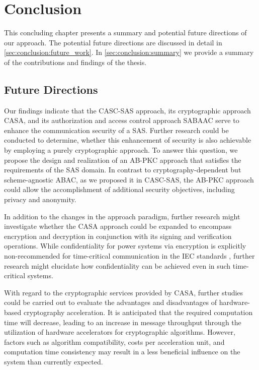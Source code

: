 \chapter{Conclusion}
\label{ch:conclusion}
This concluding chapter presents a summary and potential future directions of our approach.
The potential future directions are discussed in detail in \autoref{sec:conclusion:future_work}.
In \autoref{sec:conclusion:summary} we provide a summary of the contributions and findings of the thesis.

\section{Future Directions}
\label{sec:conclusion:future_work}
Our findings indicate that the CASC-SAS approach, its cryptographic approach CASA, and its authorization and access control approach SABAAC serve to enhance the communication security of a SAS.
Further research could be conducted to determine, whether this enhancement of security is also achievable by employing a purely cryptographic approach.
To answer this question, we propose the design and realization of an AB-PKC approach that satisfies the requirements of the SAS domain.
In contrast to cryptography-dependent but scheme-agnostic ABAC, as we proposed it in CASC-SAS, the AB-PKC approach could allow the accomplishment of additional security objectives, including privacy and anonymity.

In addition to the changes in the approach paradigm, further research might investigate whether the CASA approach could be expanded to encompass encryption and decryption in conjunction with its signing and verification operations.
While confidentiality for power systems via encryption is explicitly non-recommended for time-critical communication in the IEC standards \cite{IEC62351P6}, further research might elucidate how confidentiality can be achieved even in such time-critical systems.

With regard to the cryptographic services provided by CASA, further studies could be carried out to evaluate the advantages and disadvantages of hardware-based cryptography acceleration.
It is anticipated that the required computation time will decrease, leading to an increase in message throughput through the utilization of hardware accelerators for cryptographic algorithms.
However, factors such as algorithm compatibility, costs per acceleration unit, and computation time consistency may result in a less beneficial influence on the system than currently expected.

